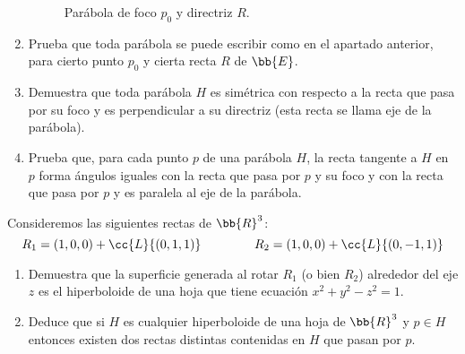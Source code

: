 \begin{ejercicio}
\begin{enumerate}
\begin{figure}[H]
        \caption{Parábola de foco $p_0$ y directriz $R$.}  
        \label{fig:ej5.3.7.Parabola}
    \end{figure}

    \item Prueba que toda parábola se puede escribir como en el apartado anterior, para cierto punto $p_0$ y cierta recta $R$ de $\bb{E}$.

    \item Demuestra que toda parábola $H$ es simétrica con respecto a la recta que pasa por su foco y es perpendicular a su directriz (esta recta se llama eje de la parábola).

    \item Prueba que, para cada punto $p$ de una parábola $H$, la recta tangente a $H$ en $p$ forma ángulos iguales con la recta que pasa por $p$ y su foco y con la recta que pasa por $p$ y es paralela al eje de la parábola.
\end{enumerate}
\end{ejercicio}

\begin{ejercicio}
    Consideremos las siguientes rectas de $\bb{R}^3$:
    \begin{equation*}
        R_1 = (1, 0, 0) + \cc{L}\{(0, 1, 1)\}\hspace{1.5cm}
        R_2 = (1, 0, 0) + \cc{L}\{(0, -1, 1)\}
    \end{equation*}
    \begin{enumerate}
        \item  Demuestra que la superficie generada al rotar $R_1$ (o bien $R_2$) alrededor del eje $z$ es el hiperboloide de una hoja que tiene ecuación $x^2+y^2-z^2=1$.

        \item Deduce que si $H$ es cualquier hiperboloide de una hoja de $\bb{R}^3$ y $p \in H$ entonces existen dos rectas distintas contenidas en $H$ que pasan por $p$.
    \end{enumerate}
\end{ejercicio}


